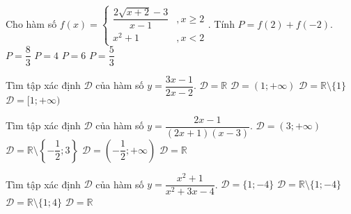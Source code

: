 \begin{ex}%
	Cho hàm số $f(x)=\left\{\begin{array}{*{35}{l}}
			\dfrac{2\sqrt{x+2}-3}{x-1} & , x\ge 2 \\
			x^2 +1                     & , x<2
		\end{array}\right.$. Tính $P=f(2)+f(-2)$.
	\choice
	{$P=\dfrac{8}{3}$}
	{$P=4$}
	{\True $P=6$}
	{$P=\dfrac{5}{3}$}
\end{ex}
\begin{ex}%
	Tìm tập xác định $\mathscr{D}$ của hàm số $y=\dfrac{3x-1}{2x-2}$.
	\choice
	{$\mathscr{D}=\mathbb{R}$}
	{$\mathscr{D}=(1;+\infty)$}
	{\True $\mathscr{D}=\mathbb{R}\setminus\{1\}$}
	{$\mathscr{D}=[1;+\infty)$}
\end{ex}
\begin{ex}%
	Tìm tập xác định $\mathscr{D}$ của hàm số $y=\dfrac{2x-1}{(2x+1)(x-3)}$.
	\choice
	{$\mathscr{D}=(3;+\infty)$}
	{\True $\mathscr{D}=\mathbb{R}\setminus\left\{-\dfrac{1}{2};3\right\}$}
	{$\mathscr{D}=\left(-\dfrac{1}{2};+\infty\right)$}
	{$\mathscr{D}=\mathbb{R}$}
\end{ex}
\begin{ex}%
	Tìm tập xác định $\mathscr{D}$ của hàm số $y=\dfrac{x^2+1}{x^2+3x-4}$.
	\choice
	{$\mathscr{D}=\{1;-4\}$}
	{\True $\mathscr{D}=\mathbb{R}\setminus\{1;-4\}$}
	{$\mathscr{D}=\mathbb{R}\setminus\{1;4\}$}
	{$\mathscr{D}=\mathbb{R}$}
\end{ex}
